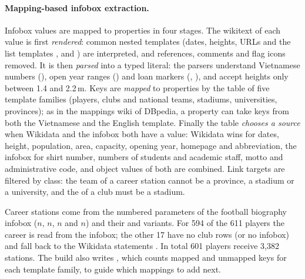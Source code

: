 \paragraph{Mapping-based infobox extraction.} Infobox values are mapped to
 properties in four stages. The wikitext of each value is first
\emph{rendered}: common nested templates (dates, heights, URLs and the list
templates ,  and ) are interpreted, and
references, comments and flag icons removed. It is then \emph{parsed} into a
typed literal: the parsers understand Vietnamese numbers (),
open year ranges () and loan markers (, ), and
accept heights only between 1.4 and 2.2\,m. Keys are \emph{mapped} to
 properties by the  table of five template families
(players, clubs and national teams, stadiums, universities, provinces); as in
the mappings wiki of DBpedia, a property can take keys from both the Vietnamese
and the English template. Finally the  table \emph{chooses a
source} when Wikidata and the infobox both have a value: Wikidata wins for
dates, height, population, area, capacity, opening year, homepage and
abbreviation, the infobox for shirt number, numbers of students and academic
staff, motto and administrative code, and object values of both are combined.
Link targets are filtered by class: the team of a career station cannot be a
province, a stadium or a university, and the  of a club must
be a stadium.

Career stations come from the numbered parameters of the football biography
infobox ($n$, $n$, $n$ and $n$)
and their  and  variants. For 594 of the 611 players
the career is read from the infobox; the other 17 have no club rows (or no
infobox) and fall back to the Wikidata statements . In total 601
players receive 3{,}382 stations. The
build also writes , which counts mapped
and unmapped keys for each template family, to guide which mappings to add next.

